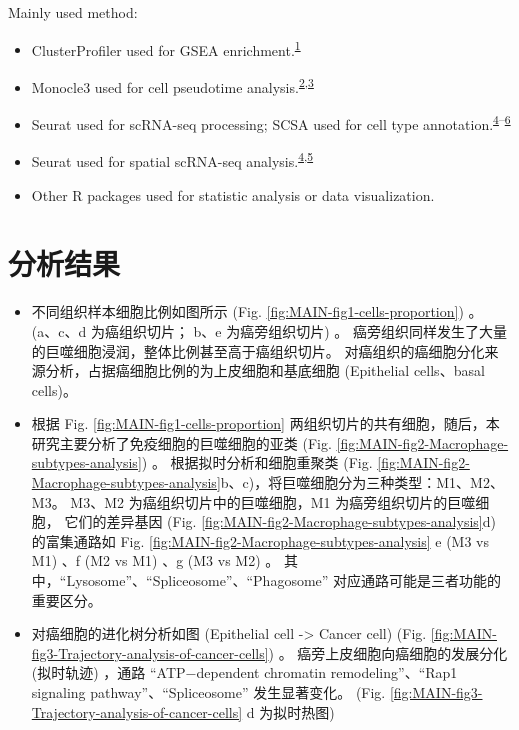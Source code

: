 \documentclass[
]{article}
\providecommand{\tightlist}{%
  \setlength{\itemsep}{0pt}\setlength{\parskip}{0pt}}
\begin{document}
Mainly used method:

\begin{itemize}
\tightlist
\item
  ClusterProfiler used for GSEA enrichment.\textsuperscript{\protect\hyperlink{ref-ClusterprofilerWuTi2021}{1}}
\item
  Monocle3 used for cell pseudotime analysis.\textsuperscript{\protect\hyperlink{ref-ReversedGraphQiuX2017}{2},\protect\hyperlink{ref-TheDynamicsAnTrapne2014}{3}}
\item
  Seurat used for scRNA-seq processing; SCSA used for cell type annotation.\textsuperscript{\protect\hyperlink{ref-IntegratedAnalHaoY2021}{4}--\protect\hyperlink{ref-ScsaACellTyCaoY2020}{6}}
\item
  Seurat used for spatial scRNA-seq analysis.\textsuperscript{\protect\hyperlink{ref-IntegratedAnalHaoY2021}{4},\protect\hyperlink{ref-ComprehensiveIStuart2019}{5}}
\item
  Other R packages used for statistic analysis or data visualization.
\end{itemize}

\hypertarget{results}{%
\section{分析结果}\label{results}}

\begin{itemize}
\tightlist
\item
  不同组织样本细胞比例如图所示 (Fig. \ref{fig:MAIN-fig1-cells-proportion}) 。
  (a、c、d 为癌组织切片； b、e 为癌旁组织切片) 。
  癌旁组织同样发生了大量的巨噬细胞浸润，整体比例甚至高于癌组织切片。
  对癌组织的癌细胞分化来源分析，占据癌细胞比例的为上皮细胞和基底细胞 (Epithelial cells、basal cells)。
\item
  根据 Fig. \ref{fig:MAIN-fig1-cells-proportion}
  两组织切片的共有细胞，随后，本研究主要分析了免疫细胞的巨噬细胞的亚类
  (Fig. \ref{fig:MAIN-fig2-Macrophage-subtypes-analysis}) 。
  根据拟时分析和细胞重聚类 (Fig. \ref{fig:MAIN-fig2-Macrophage-subtypes-analysis}b、c)，将巨噬细胞分为三种类型：M1、M2、M3。
  M3、M2 为癌组织切片中的巨噬细胞，M1 为癌旁组织切片的巨噬细胞，
  它们的差异基因 (Fig. \ref{fig:MAIN-fig2-Macrophage-subtypes-analysis}d) 的富集通路如
  Fig. \ref{fig:MAIN-fig2-Macrophage-subtypes-analysis} e (M3 vs M1) 、f (M2 vs M1) 、g (M3 vs M2) 。
  其中，``Lysosome''、``Spliceosome''、``Phagosome'' 对应通路可能是三者功能的重要区分。
\item
  对癌细胞的进化树分析如图 (Epithelial cell -\textgreater{} Cancer cell) (Fig. \ref{fig:MAIN-fig3-Trajectory-analysis-of-cancer-cells}) 。
  癌旁上皮细胞向癌细胞的发展分化 (拟时轨迹) ，通路 ``ATP−dependent chromatin
  remodeling''、``Rap1 signaling pathway''、``Spliceosome'' 发生显著变化。
  (Fig. \ref{fig:MAIN-fig3-Trajectory-analysis-of-cancer-cells} d 为拟时热图)
\end{itemize}
\end{document}
